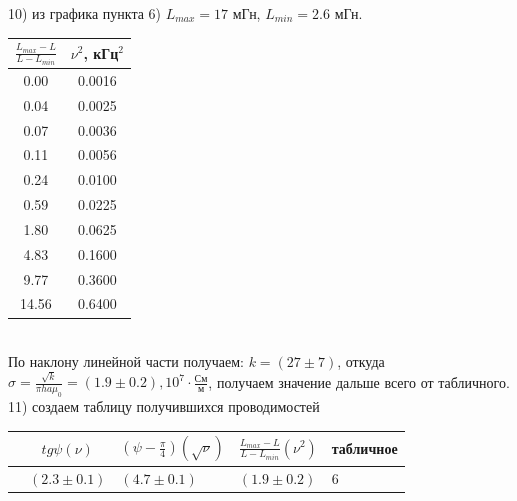 \documentclass[a4paper,12pt]{extarticle}
\begin{document}
10) из графика пункта 6) $L_{max} = 17$ мГн, $L_{min} = 2.6$ мГн.\\
\begin{tabular}{|c|c|}
\hline
$\frac{L_{max}-L}{L-L_{min}}$    & $\nu^2$, кГц$^2$ \\ \hline
0.00  & 0.0016                \\ \hline
0.04  & 0.0025                \\ \hline
0.07  & 0.0036                \\ \hline
0.11  & 0.0056                \\ \hline
0.24  & 0.0100                \\ \hline
0.59  & 0.0225                \\ \hline
1.80  & 0.0625                \\ \hline
4.83  & 0.1600                \\ \hline
9.77  & 0.3600                \\ \hline
14.56 & 0.6400                \\ \hline
\end{tabular}
\begin{minipage}{1\textwidth}
\end{minipage}\\
По наклону линейной части получаем: $k = (27\pm7)$, откуда $\sigma = \frac{\sqrt{k}}{\pi h a \mu_0} = (1.9\pm0.2), 10^7\cdot\frac{\text{См}}{\text{м}}$, получаем значение дальше всего от табличного.\\
11) создаем таблицу получившихся проводимостей\\
\begin{tabular}{|c|c|l|l|l|}
\hline
 & $tg\psi (\nu)$ & $(\psi - \frac{\pi}{4})(\sqrt{\nu})$ & $\frac{L_{max}-L}{L-L_{min}} (\nu^2)$ & табличное \\ \hline
 & $(2.3\pm0.1)$ & $(4.7\pm0.1)$ & $(1.9\pm0.2)$ & 6 \\ \hline
\end{tabular}
\end{document}
